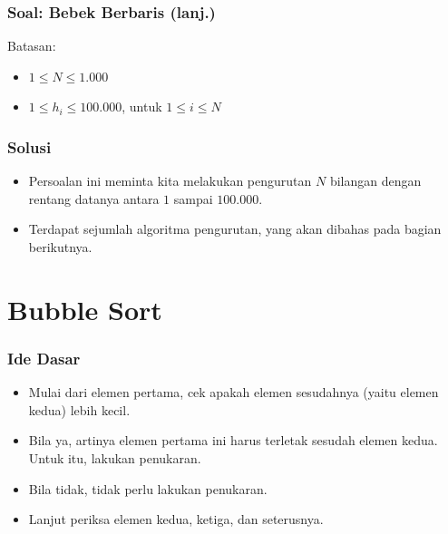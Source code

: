 \begin{frame}
\frametitle{Soal: Bebek Berbaris (lanj.)}
  Batasan:
  \begin{itemize}
    \item $1 \le N \le 1.000$
    \item $1 \le h_i \le 100.000$, untuk $1 \le i \le N$
  \end{itemize}
\end{frame}


\begin{frame}
\frametitle{Solusi}
  \begin{itemize}
    \item Persoalan ini meminta kita melakukan pengurutan $N$ bilangan dengan rentang datanya antara $1$ sampai $100.000$.
    \item Terdapat sejumlah algoritma pengurutan, yang akan dibahas pada bagian berikutnya.
  \end{itemize}
\end{frame}

\section{Bubble Sort}
\frame{\sectionpage}

\begin{frame}
\frametitle{Ide Dasar}
  \begin{itemize}
    \item Mulai dari elemen pertama, cek apakah elemen sesudahnya (yaitu elemen kedua) lebih kecil.
    \item Bila ya, artinya elemen pertama ini harus terletak sesudah elemen kedua. Untuk itu, lakukan penukaran.
    \item Bila tidak, tidak perlu lakukan penukaran.
    \item Lanjut periksa elemen kedua, ketiga, dan seterusnya.
  \end{itemize}
\end{frame}

